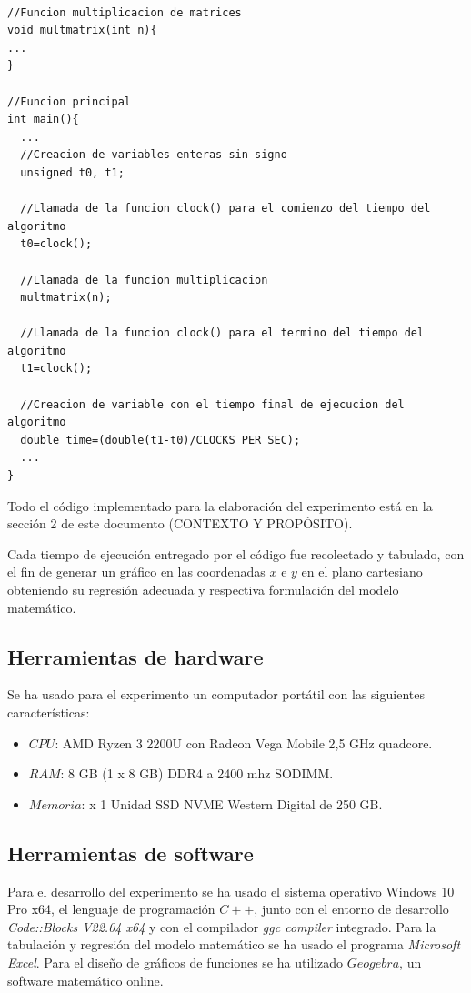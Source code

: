 \documentclass[11pt, twocolumn]{llncs}
\begin{document}
\lstset{language=, breaklines=true, basicstyle=\footnotesize}
\begin{lstlisting}[frame=single]

//Funcion multiplicacion de matrices
void multmatrix(int n){
...
}

//Funcion principal
int main(){
  ...
  //Creacion de variables enteras sin signo
  unsigned t0, t1;
  
  //Llamada de la funcion clock() para el comienzo del tiempo del algoritmo
  t0=clock();
  
  //Llamada de la funcion multiplicacion
  multmatrix(n);
  
  //Llamada de la funcion clock() para el termino del tiempo del algoritmo
  t1=clock();
  
  //Creacion de variable con el tiempo final de ejecucion del algoritmo
  double time=(double(t1-t0)/CLOCKS_PER_SEC);
  ...
}

\end{lstlisting}

Todo el código implementado para la elaboración del experimento está en la sección 2 de este documento (CONTEXTO Y PROPÓSITO).

Cada tiempo de ejecución entregado por el código fue recolectado y tabulado, con el fin de generar un gráfico en las coordenadas $x$ e $y$ en el plano cartesiano obteniendo su regresión adecuada y respectiva formulación del modelo matemático.

\subsection{Herramientas de hardware}
Se ha usado para el experimento un computador portátil con las siguientes características:

\begin{itemize}
    \item $CPU$: AMD Ryzen 3 2200U con Radeon Vega Mobile 2,5 GHz quadcore.
    \item $RAM$: 8 GB (1 x 8 GB) DDR4 a 2400 mhz SODIMM.
    \item $Memoria$: x 1 Unidad SSD NVME Western Digital de 250 GB.
\end{itemize}

\subsection{Herramientas de software}
Para el desarrollo del experimento se ha usado el sistema operativo Windows 10 Pro x64, el lenguaje de programación $C++$, junto con el entorno de desarrollo \textit{Code::Blocks V22.04 x64} y con el compilador \textit{ggc compiler} integrado. Para la tabulación y regresión del modelo matemático se ha usado el programa \textit{Microsoft Excel}. Para el diseño de gráficos de funciones se ha utilizado $Geogebra$, un software matemático online.
\end{document}
